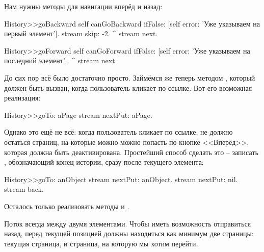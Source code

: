 \documentclass[a4paper,10pt,twoside]{book}
\begin{document}
Нам нужны методы для навигации вперёд и назад:

\begin{code}{}
History>>goBackward
  self canGoBackward ifFalse: [self error: 'Уже указываем на первый элемент'].
  stream skip: -2.
  ^ stream next.

History>>goForward
  self canGoForward ifFalse: [self error: 'Уже указываем на последний элемент'].
  ^ stream next
\end{code}

До сих пор всё было достаточно просто. Займёмся же теперь методом , который должен быть вызван, когда пользователь кликает по ссылке. Вот его возможная реализация:

\begin{code}{}
History>>goTo: aPage
    stream nextPut: aPage.
\end{code}

Однако это ещё не всё: когда пользователь кликает по ссылке, не должно остаться страниц, на которые можно можно попасть по кнопке <<Вперёд>>, которая должна быть деактивирована. Простейший способ сделать это -- записать , обозначающий конец истории, сразу после текущего элемента:

\begin{code}{}
History>>goTo: anObject
  stream nextPut: anObject.
  stream nextPut: nil.
  stream back.
\end{code}

Осталось только реализовать методы  и .

Поток всегда  между двумя элементами. Чтобы иметь возможность отправиться назад, перед текущей позицией должны находиться как минимум две страницы: текущая страница, и страница, на которую мы хотим перейти.
\end{document}
